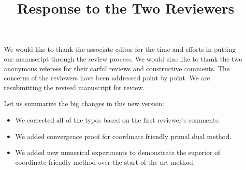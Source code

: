 \documentclass[amsa]{ipart}
\begin{document}
\title{Response to the Two Reviewers}
\vspace{5mm}

We would like to thank the associate editor for the time and efforts in putting our manuscript through the review process. We would also like to thank the two anonymous referees for their carful reviews and constructive comments. The concerns of the reviewers have been addressed point by point. We are resubmitting the revised manuscript for review. 

Let us summarize the big changes in this new version:
\begin{itemize}
\item We corrected all of the typos based on the first reviewer's comments. 
\item We added convergence proof for coordinate friendly primal dual method. 
\item We added new numerical experiments to demonstrate the superior of coordinate friendly method over the start-of-the-art method. 
\end{itemize}
\end{document}

